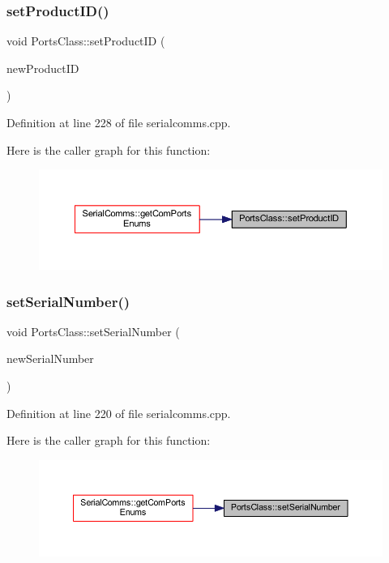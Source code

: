 \subsubsection{\texorpdfstring{setProductID()}{setProductID()}}
{\footnotesize\ttfamily void Ports\+Class\+::set\+Product\+ID (\begin{DoxyParamCaption}\item[{Q\+String}]{new\+Product\+ID }\end{DoxyParamCaption})}



Definition at line 228 of file serialcomms.\+cpp.

Here is the caller graph for this function\+:
\nopagebreak
\begin{figure}[H]
\begin{center}
\leavevmode
\includegraphics[width=350pt]{class_ports_class_a2bee64115fdaa041202522a909e66e00_icgraph}
\end{center}
\end{figure}
\mbox{\label{class_ports_class_a42d72f9dd8aff882cb338efe798f1721}} 
\subsubsection{\texorpdfstring{setSerialNumber()}{setSerialNumber()}}
{\footnotesize\ttfamily void Ports\+Class\+::set\+Serial\+Number (\begin{DoxyParamCaption}\item[{Q\+String}]{new\+Serial\+Number }\end{DoxyParamCaption})}



Definition at line 220 of file serialcomms.\+cpp.

Here is the caller graph for this function\+:
\nopagebreak
\begin{figure}[H]
\begin{center}
\leavevmode
\includegraphics[width=350pt]{class_ports_class_a42d72f9dd8aff882cb338efe798f1721_icgraph}
\end{center}
\end{figure}
\mbox{\label{class_ports_class_af42f48bd88679919b34f19f0f05673c1}} 

